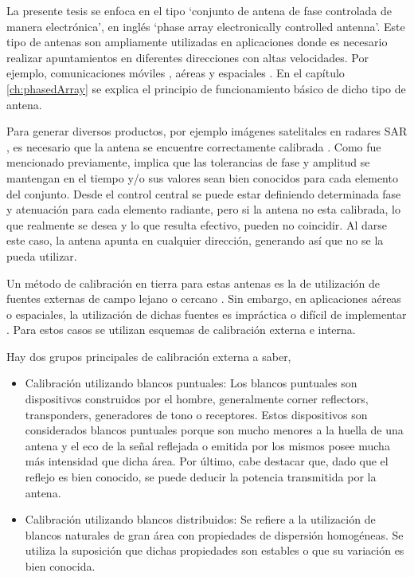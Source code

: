 La presente tesis se enfoca en el tipo \enquote*{conjunto de antena de fase controlada de manera electrónica}, en inglés
\enquote*{phase array electronically controlled antenna}. Este tipo de antenas son ampliamente utilizadas en aplicaciones donde 
es necesario realizar apuntamientos en diferentes direcciones con altas velocidades. Por ejemplo, comunicaciones móviles 
\cite{Chen2012}, aéreas \cite{MHong1989} y espaciales \cite{Shimada1995}\cite{Makhoul2012}. En el capítulo \ref{ch:phasedArray}
se explica el principio de funcionamiento básico de dicho tipo de antena.

Para generar diversos productos, por ejemplo imágenes satelitales en radares SAR \cite{Freeman1992}, es necesario que la
antena se encuentre correctamente calibrada \cite{Luscombe1990}\cite{Seifert1996}\cite{Dall1994}. Como fue mencionado 
previamente, implica que las tolerancias de fase y amplitud se mantengan en el tiempo y/o sus valores sean bien conocidos para
cada elemento del conjunto. Desde el control central se puede estar definiendo determinada fase y atenuación para cada elemento
radiante, pero si la antena no esta calibrada, lo que realmente se desea y lo que resulta efectivo, pueden no coincidir. Al darse
este caso, la antena apunta en cualquier dirección, generando así que no se la pueda utilizar.

Un método de calibración en tierra para estas antenas es la de utilización de fuentes externas de campo lejano o cercano
\cite{Agrawal2003}. Sin embargo, en aplicaciones aéreas o espaciales, la utilización de dichas fuentes es impráctica o
difícil de implementar \cite{Aumann1989}. Para estos casos se utilizan esquemas de calibración externa e interna.

Hay dos grupos principales de calibración externa a saber,
\begin{itemize}
	\item Calibración utilizando blancos puntuales: Los blancos puntuales son dispositivos construidos por el hombre, generalmente
		corner reflectors, transponders, generadores de tono o receptores. Estos dispositivos son considerados blancos puntuales porque
		son mucho menores a la huella de una antena y el eco de la señal reflejada o emitida por los mismos posee mucha más intensidad
		que dicha área. Por último, cabe destacar que, dado que el reflejo es bien conocido, se puede deducir la potencia transmitida
		por la antena. 
	\item Calibración utilizando blancos distribuidos: Se refiere a la utilización de blancos naturales de gran área con 
		propiedades de dispersión homogéneas. Se utiliza la suposición que dichas propiedades son estables o que su variación es
		bien conocida.
\end{itemize}

